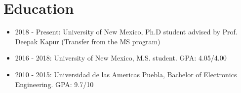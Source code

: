 \section{Education}

\begin{itemize}
\item 2018 - Present: University of New Mexico, Ph.D student advised by
  Prof. Deepak Kapur (Transfer from the MS program)
\item 2016 - 2018: University of New Mexico, M.S. student. GPA: 4.05/4.00
\item 2010 - 2015: Universidad de las Americas Puebla, Bachelor of
  Electronics Engineering. GPA: 9.7/10
\end{itemize}


